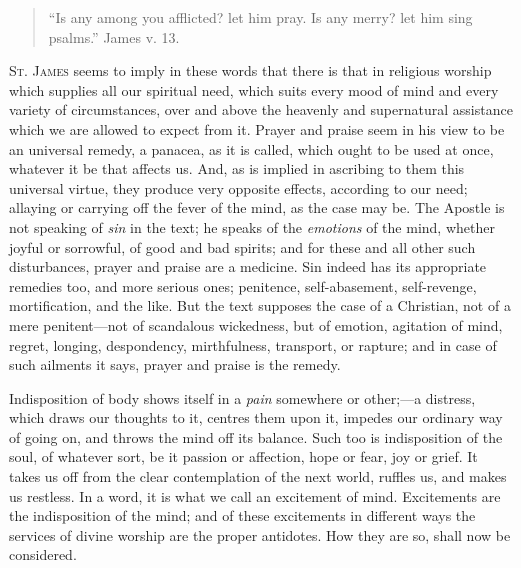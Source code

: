 
\begin{quote}

``Is any among you afflicted? let him pray. Is
any merry? let him sing psalms.'' James v. 13.

\end{quote}

S\textsc{t}. J\textsc{ames} seems to imply in these words that there is that in
religious worship which supplies all our spiritual need, which suits
every mood of mind and every variety of circumstances, over and above
the heavenly and supernatural assistance which we are allowed to
expect from it. Prayer and praise seem in his view to be an universal
remedy, a panacea, as it is called, which ought to be used at once,
whatever it be that affects us. And, as is implied in ascribing to
them this universal virtue, they produce very opposite effects,
according to our need; allaying or carrying off the fever of the mind,
as the case may be. The Apostle is not speaking of \emph{sin} in the
text; he speaks of the \emph{emotions} of the mind, whether joyful or
sorrowful, of good and bad spirits; and for these and all other such
disturbances, prayer and praise are a medicine. Sin indeed has its
appropriate remedies too, and more serious ones; penitence,
self-abasement, self-revenge, mortification, and the like. But the
text supposes the case of a Christian, not of a mere penitent—not of
scandalous wickedness, but of emotion, agitation of mind, regret,
longing, despondency, mirthfulness, transport, or rapture; and in case
of such ailments it says, prayer and praise is the remedy.

Indisposition of body shows itself in a \emph{pain} somewhere or
other;—a distress, which draws our thoughts to it, centres them upon
it, impedes our ordinary way of going on, and throws the mind off its
balance. Such too is indisposition of the soul, of whatever sort, be
it passion or affection, hope or fear, joy or grief. It takes us off
from the clear contemplation of the next world, ruffles us, and makes
us restless. In a word, it is what we call an excitement of mind.
Excitements are the indisposition of the mind; and of these
excitements in different ways the services of divine worship are the
proper antidotes. How they are so, shall now be considered.

